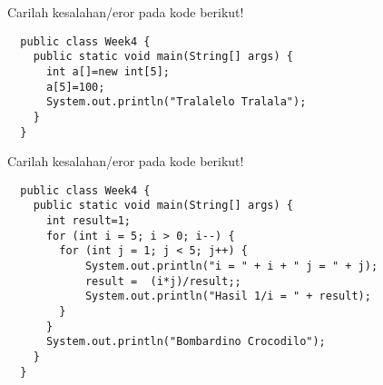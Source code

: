 \documentclass{../praktikum-ppt}
\begin{document}
    \begin{frame}[fragile]
      \begin{game}
        Carilah kesalahan/eror pada kode berikut!
      \end{game}
      \begin{lstlisting}
  public class Week4 { 
    public static void main(String[] args) {        
      int a[]=new int[5];        
      a[5]=100;    
      System.out.println("Tralalelo Tralala"); 
    } 
  }
      \end{lstlisting}
    \end{frame}
    \begin{frame}[fragile]
      \begin{game}
        Carilah kesalahan/eror pada kode berikut!
      \end{game}
      \begin{lstlisting}
  public class Week4 { 
    public static void main(String[] args) {     
      int result=1;   
      for (int i = 5; i > 0; i--) {
        for (int j = 1; j < 5; j++) {
            System.out.println("i = " + i + " j = " + j);
            result =  (i*j)/result;;
            System.out.println("Hasil 1/i = " + result);
        }
      }
      System.out.println("Bombardino Crocodilo"); 
    } 
  }
      \end{lstlisting}
    \end{frame}
\end{document}
